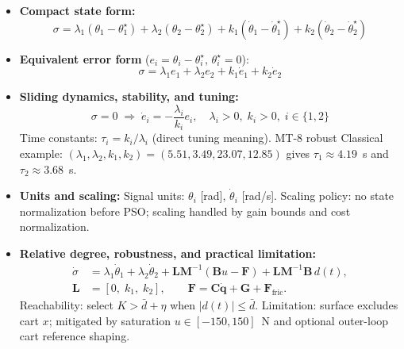\documentclass[10pt, a4paper]{article}
\newcommand{\vq}{\boldsymbol{q}}
\begin{document}
\begin{itemize}[leftmargin=1.5em,itemsep=0.2em]
  \item \textbf{Compact state form:}
  \begin{equation}
    \sigma = \lambda_1(\theta_1-\theta_1^\star)
    + \lambda_2(\theta_2-\theta_2^\star)
    + k_1(\dot{\theta}_1-\dot{\theta}_1^\star)
    + k_2(\dot{\theta}_2-\dot{\theta}_2^\star)
    \label{eq:surface}
  \end{equation}

  \item \textbf{Equivalent error form} ($e_i=\theta_i-\theta_i^\star$, $\theta_i^\star=0$):
  \begin{equation}
    \sigma = \lambda_1 e_1 + \lambda_2 e_2 + k_1\dot{e}_1 + k_2\dot{e}_2
  \end{equation}

  \item \textbf{Sliding dynamics, stability, and tuning:}
  \begin{equation}
    \sigma=0 \;\Rightarrow\; \dot{e}_i = -\frac{\lambda_i}{k_i}e_i,\quad
    \lambda_i>0,\;k_i>0,\; i\in\{1,2\}
    \label{eq:stability_cond}
  \end{equation}
  Time constants: $\tau_i = k_i/\lambda_i$ (direct tuning meaning).
  MT-8 robust Classical example: $(\lambda_1,\lambda_2,k_1,k_2)=(5.51,3.49,23.07,12.85)$
  gives $\tau_1\approx4.19$~s and $\tau_2\approx3.68$~s.

  \item \textbf{Units and scaling:}
  Signal units: $\theta_i$ [rad], $\dot{\theta}_i$ [rad/s].
  Scaling policy: no state normalization before PSO; scaling handled by gain bounds
  and cost normalization.

  \item \textbf{Relative degree, robustness, and practical limitation:}
  \begin{equation}
    \begin{aligned}
      \dot{\sigma} &=
      \lambda_1\dot{\theta}_1 + \lambda_2\dot{\theta}_2
      + \mathbf{L}\mathbf{M}^{-1}\!\left(\mathbf{B}u-\mathbf{F}\right)
      + \mathbf{L}\mathbf{M}^{-1}\mathbf{B}\,d(t), \\
      \mathbf{L} &= [0,\;k_1,\;k_2], \qquad
      \mathbf{F} = \mathbf{C}\dot{\vq}+\mathbf{G}+\mathbf{F}_\text{fric}.
    \end{aligned}
    \label{eq:sigma_dynamics}
  \end{equation}
  Reachability: select $K>\bar{d}+\eta$ when $|d(t)|\le\bar{d}$.
  Limitation: surface excludes cart $x$; mitigated by saturation $u\in[-150,150]$~N
  and optional outer-loop cart reference shaping.
\end{itemize}
\end{document}
